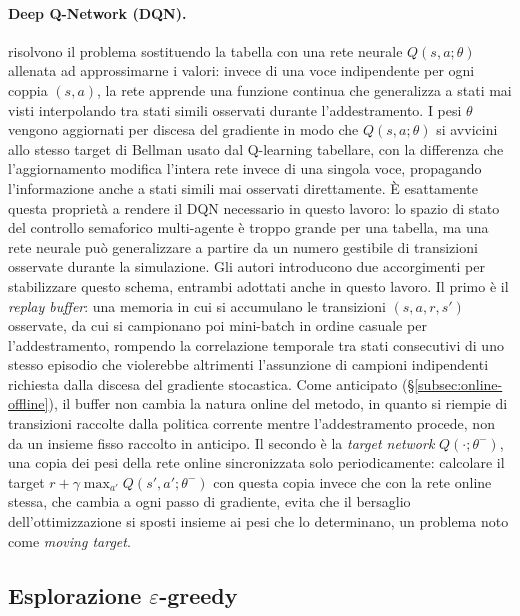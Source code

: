 \paragraph{Deep Q-Network (DQN).} \citet{mnih2015dqn} risolvono il
problema sostituendo la tabella con una rete neurale $Q(s,a;\theta)$
allenata ad approssimarne i valori: invece di una voce indipendente per
ogni coppia $(s,a)$, la rete apprende una funzione continua che
generalizza a stati mai visti interpolando tra stati simili osservati
durante l'addestramento. I pesi $\theta$ vengono aggiornati
per discesa del gradiente in modo che $Q(s,a;\theta)$ si avvicini allo
stesso target di Bellman usato dal Q-learning tabellare, con la
differenza che l'aggiornamento modifica l'intera rete invece di una
singola voce, propagando l'informazione anche a stati simili mai
osservati direttamente. È esattamente questa proprietà a rendere il DQN
necessario in questo lavoro: lo spazio di stato del controllo semaforico
multi-agente è troppo grande per una tabella, ma una rete neurale può
generalizzare a partire da un numero gestibile di transizioni osservate
durante la simulazione. Gli autori introducono due accorgimenti per
stabilizzare questo schema, entrambi adottati anche in questo lavoro. Il
primo è il \emph{replay buffer}: una memoria in cui si accumulano le
transizioni $(s,a,r,s')$ osservate, da cui si campionano poi mini-batch
in ordine casuale per l'addestramento, rompendo la correlazione temporale
tra stati consecutivi di uno stesso episodio che violerebbe altrimenti
l'assunzione di campioni indipendenti richiesta dalla discesa del
gradiente stocastica. Come anticipato (§\ref{subsec:online-offline}), il
buffer non cambia la natura online del metodo, in quanto si riempie di
transizioni raccolte dalla politica corrente mentre l'addestramento
procede, non da un insieme fisso raccolto in anticipo. Il secondo è la
\emph{target network} $Q(\cdot;\theta^-)$, una copia dei pesi della rete
online sincronizzata solo periodicamente: calcolare il target $r +
  \gamma \max_{a'} Q(s',a';\theta^-)$ con questa copia invece che con la
rete online stessa, che cambia a ogni passo di gradiente, evita che il
bersaglio dell'ottimizzazione si sposti insieme ai pesi che lo
determinano, un problema noto come \emph{moving target}.

\subsection{Esplorazione $\varepsilon$-greedy}


